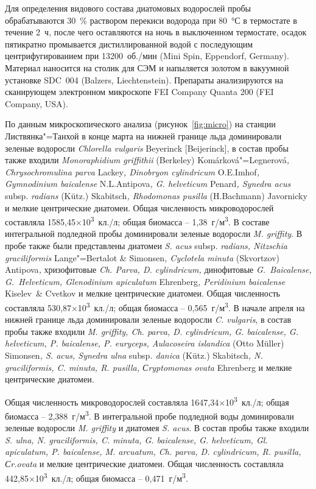 \documentclass[a4paper,12pt,openany,final]{extreport}
\begin{document}
Для определения видового состава диатомовых водорослей пробы обрабатываются 30~\% раствором перекиси водорода при 80~°С в термостате в течение 2~ч, после чего оставляются на ночь в выключенном термостате, осадок пятикратно промывается дистиллированной водой с последующим центрифугированием при 13200~об./мин (Mini Spin, Eppendorf, Germany). Материал наносится на столик для СЭМ и напыляется золотом в вакуумной установке SDC~004 (Balzers, Liechtenstein). Препараты анализируются на сканирующем электронном микроскопе FEI Company Quanta 200 (FEI Company, USA).


По данным микроскопического анализа (рисунок~\ref{fig:micro}) на станции Листвянка"=Танхой в конце марта на нижней границе льда доминировали зеленые водоросли \emph{Chlorella vulgaris} Beyerinck {[}Beijerinck{]}, в состав пробы также входили \emph{Monoraphidium griffithii} (Berkeley) Komárková"=Legnerová\emph{, Chrysochromulina parva} Lackey\emph{, Dinobryon cylindricum} O.E.Imhof\emph{, Gymnodinium baicalense} N.L.Antipova\emph{, G. helveticum} Penard\emph{, Synedra acus} subsp.  \emph{radians} (Kütz.) Skabitsch\emph{, Rhodomonas pusilla} (H.Bachmann) Javornicky и мелкие центрические диатомеи. Общая численность микроводорослей составляла 1585,45×10\textsuperscript{3}~кл./л; общая биомасса -- 1,38~г/м\textsuperscript{3}. В составе интегральной подледной пробы доминировали зеленые водоросли \emph{M. griffity}. В пробе также были представлены диатомеи \emph{S. acus} subsp. \emph{radians, Nitzschia graciliformis} Lange"=Bertalot \& Simonsen\emph{, Cyclotela minuta} (Skvortzov) Antipova\emph{,} хризофитовые \emph{Ch. Parva, D.  cylindricum,} динофитовые \emph{G.~Baicalense, G.~Helveticum, Glenodinium apiculatum} Ehrenberg\emph{, Peridinium baicalense} Kiselev~\& Cvetkov и мелкие центрические диатомеи. Общая численность составляла 530,87×10\textsuperscript{3}~кл./л; общая биомасса -- 0,565~г/м\textsuperscript{3}. В начале апреля на нижней границе льда доминировали зеленые водоросли \emph{C. vulgaris}, в состав пробы также входили \emph{M. griffity, Ch. parva, D. cylindricum, G. baicalense, G.  helveticum, P. baicalense, P. euryceps, Aulacoseira islandica} (Otto Müller) Simonsen\emph{, S. acus, Synedra ulna} subsp\emph{. danica} (Kütz.) Skabitsch\emph{, N. graciliformis, C. minuta, R. pusilla, Сryptomonas ovata} Ehrenberg и мелкие центрические диатомеи.


Общая численность микроводорослей составляла 1647,34×10\textsuperscript{3}~кл./л; общая биомасса -- 2,388~г/м\textsuperscript{3}. В интегральной пробе подледной воды доминировали зеленые водоросли \emph{M. griffity} и диатомея \emph{S.  acus}. В состав пробы также входили \emph{S. ulna, N. graciliformis, C.  minuta, G. baicalense, G. helveticum, Gl. apiculatum, P. baicalense, M.  arcuatum, Ch. parva, D. cylindricum, R. pusilla, Сr.ovata} и мелкие центрические диатомеи. Общая численность составляла 442,85×10\textsuperscript{3}~кл./л; общая биомасса -- 0,471~г/м\textsuperscript{3}.
\end{document}

